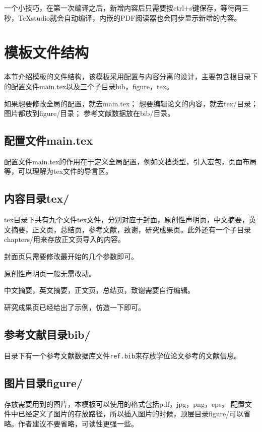一个小技巧，在第一次编译之后，新增内容后只需要按ctrl+s键保存，等待两三秒，TeXstudio就会自动编译，内嵌的PDF阅读器也会同步显示新增的内容。

\section{模板文件结构}

本节介绍模板的文件结构，该模板采用配置与内容分离的设计，主要包含根目录下的配置文件main.tex以及三个子目录bib，figure，tex。

如果想要修改全局的配置，就去main.tex；
想要编辑论文的内容，就去tex/目录；
图片都放到figure/目录；
参考文献数据放在bib/目录。

\subsection{配置文件main.tex}

配置文件main.tex的作用在于定义全局配置，例如文档类型，引入宏包，页面布局等，可以理解为tex文件的导言区。

\subsection{内容目录tex/}

tex目录下共有九个文件tex文件，分别对应于封面，原创性声明页，中文摘要，英文摘要，正文页，总结页，参考文献，致谢，研究成果页。此外还有一个子目录chapters/用来存放正文页导入的内容。

封面页只需要修改最开始的几个参数即可。

原创性声明页一般无需改动。

中文摘要，英文摘要，正文页，总结页，致谢需要自行编辑。

研究成果页已经给出了示例，仿造一下即可。

\subsection{参考文献目录bib/}

目录下有一个参考文献数据库文件\verb|ref.bib|来存放学位论文参考的文献信息。

\subsection{图片目录figure/}

存放需要用到的图片，本模板可以使用的格式包括pdf，jpg，png，eps。
配置文件中已经定义了图片的存放路径，所以插入图片的时候，顶层目录figure/可以省略。作者建议不要省略，可读性更强一些。
